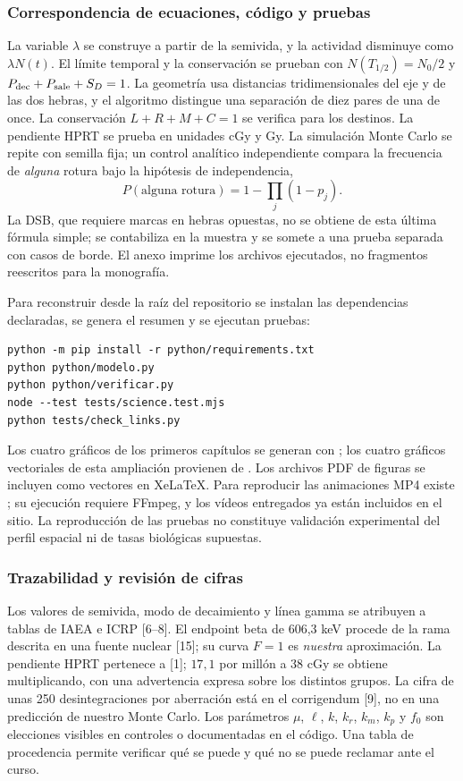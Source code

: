 \subsubsection{Correspondencia de ecuaciones, código y pruebas}
La variable $\lambda$ se construye a partir de la semivida, y la actividad
disminuye como $\lambda N(t)$. El límite temporal y la conservación se
prueban con $N(T_{1/2})=N_0/2$ y
$P_{\rm dec}+P_{\rm sale}+S_D=1$. La geometría usa distancias
tridimensionales del eje y de las dos hebras, y el algoritmo distingue
una separación de diez pares de una de once. La conservación
$L+R+M+C=1$ se verifica para los destinos. La pendiente HPRT se prueba
en unidades cGy y Gy. La simulación Monte Carlo se repite con semilla
fija; un control analítico independiente compara la frecuencia de
\emph{alguna} rotura bajo la hipótesis de independencia,
\[
P(\text{alguna rotura})=1-\prod_{j}(1-p_j).
\]
La DSB, que requiere marcas en hebras opuestas, no se obtiene de esta
última fórmula simple; se contabiliza en la muestra y se somete a una
prueba separada con casos de borde. El anexo imprime los archivos
ejecutados, no fragmentos reescritos para la monografía.

Para reconstruir desde la raíz del repositorio se instalan las
dependencias declaradas, se genera el resumen y se ejecutan pruebas:
\begin{verbatim}
python -m pip install -r python/requirements.txt
python python/modelo.py
python python/verificar.py
node --test tests/science.test.mjs
python tests/check_links.py
\end{verbatim}
Los cuatro gráficos de los primeros capítulos se generan con
; los cuatro gráficos vectoriales
de esta ampliación provienen de .
Los archivos PDF de figuras se incluyen como vectores en XeLaTeX.
Para reproducir las animaciones MP4 existe ; su
ejecución requiere FFmpeg, y los vídeos entregados ya están incluidos
en el sitio. La reproducción de las pruebas no constituye validación
experimental del perfil espacial ni de tasas biológicas supuestas.

\subsubsection{Trazabilidad y revisión de cifras}
Los valores de semivida, modo de decaimiento y línea gamma se atribuyen
a tablas de IAEA e ICRP [6--8]. El endpoint beta de 606,3 keV procede
de la rama descrita en una fuente nuclear [15]; su curva $F=1$ es
\emph{nuestra} aproximación. La pendiente HPRT pertenece a [1]; $17,1$
por millón a 38 cGy se obtiene multiplicando, con una advertencia
expresa sobre los distintos grupos. La cifra de unas 250
desintegraciones por aberración está en el corrigendum [9], no en una
predicción de nuestro Monte Carlo. Los parámetros $\mu$, $\ell$, $k$,
$k_r$, $k_m$, $k_p$ y $f_0$ son elecciones visibles en controles o
documentadas en el código. Una tabla de procedencia permite verificar
qué se puede y qué no se puede reclamar ante el curso.

